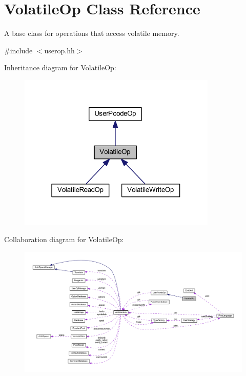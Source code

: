 \hypertarget{class_volatile_op}{}\section{Volatile\+Op Class Reference}
\label{class_volatile_op}


A base class for operations that access volatile memory.  




{\ttfamily \#include $<$userop.\+hh$>$}



Inheritance diagram for Volatile\+Op\+:
\nopagebreak
\begin{figure}[H]
\begin{center}
\leavevmode
\includegraphics[width=268pt]{class_volatile_op__inherit__graph}
\end{center}
\end{figure}


Collaboration diagram for Volatile\+Op\+:
\nopagebreak
\begin{figure}[H]
\begin{center}
\leavevmode
\includegraphics[width=350pt]{class_volatile_op__coll__graph}
\end{center}
\end{figure}
